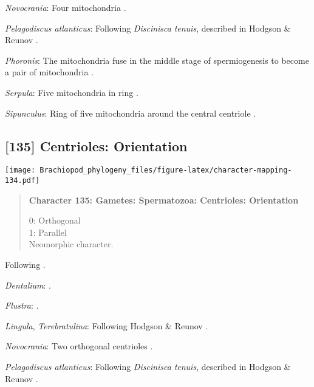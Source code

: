 \documentclass[openany]{book}
\theoremstyle{definition}
\theoremstyle{definition}
\theoremstyle{definition}
\theoremstyle{remark}
\begin{document}
\hypertarget{Novocrania-coding-134}{}
\emph{Novocrania}: Four mitochondria \citep{Afzelius1978Finestructure}.

\hypertarget{Pelagodiscus_atlanticus-coding-134}{}
\emph{Pelagodiscus atlanticus}: Following \emph{Discinisca}
\emph{tenuis}, described in Hodgson \& Reunov
\citeyearpar{Hodgson1994Ultrastructureof}.

\hypertarget{Phoronis-coding-134}{}
\emph{Phoronis}: The mitochondria fuse in the middle stage of
spermiogenesis to become a pair of mitochondria
\citep{Reunov2004Ultrastructuralstudy}.

\hypertarget{Serpula-coding-134}{}
\emph{Serpula}: Five mitochondria in ring \citep{Gherardi2011}.

\hypertarget{Sipunculus-coding-134}{}
\emph{Sipunculus}: Ring of five mitochondria around the central
centriole \citep{Rice1993}.

\subsection*{{[}135{]} Centrioles:
Orientation}\label{centrioles-orientation}

\texttt{[image: Brachiopod\_phylogeny\_files/figure-latex/character-mapping-134.pdf]}

\begin{quote}
\textbf{Character 135: Gametes: Spermatozoa: Centrioles: Orientation}

0: Orthogonal\\
1: Parallel\\
Neomorphic character.
\end{quote}

Following \citet{Hodgson1994Ultrastructureof}.

\hypertarget{Dentalium-coding-135}{}
\emph{Dentalium}: \citet{DufresneDube1983}.

\hypertarget{Flustra-coding-135}{}
\emph{Flustra}: \citep{Franzen1981}.

\hypertarget{Lingula-coding-135}{}
\emph{Lingula}, \emph{Terebratulina}: Following Hodgson \& Reunov
\citeyearpar{Hodgson1994Ultrastructureof}.

\hypertarget{Novocrania-coding-135}{}
\emph{Novocrania}: Two orthogonal centrioles
\citep{Afzelius1978Finestructure}.

\hypertarget{Pelagodiscus_atlanticus-coding-135}{}
\emph{Pelagodiscus atlanticus}: Following \emph{Discinisca}
\emph{tenuis}, described in Hodgson \& Reunov
\citeyearpar{Hodgson1994Ultrastructureof}.
\end{document}
